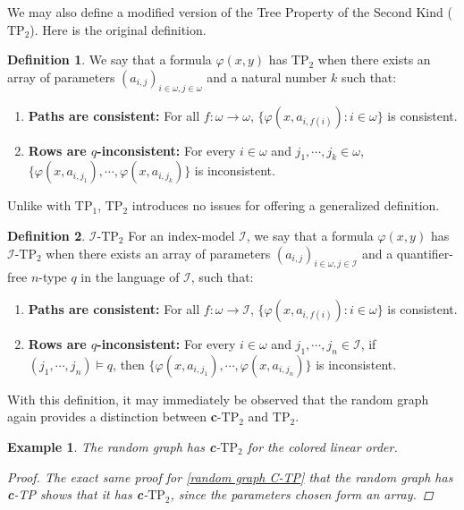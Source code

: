 \documentclass{article}
\newcommand{\calI}{\mathcal{I}}
\newcommand{\TPi}{\text{TP}_1}
\newcommand{\TPii}{\text{TP}_2}
\newcommand{\vphi}{\varphi}
\newtheorem{example}{Example}
\theoremstyle{definition}
\newtheorem{definition}{Definition}
\theoremstyle{definition}
\theoremstyle{definition}
\theoremstyle{definition}
\begin{document}
We may also define a modified version of the Tree Property of the Second Kind ($\TPii$). Here is the original definition.

\begin{definition}{}\label{TP2 definition}
        We say that a formula $\vphi(x,y)$ has $\text{TP}_2$ when there exists an array of parameters $(a_{i,j})_{i\in \omega, j\in \omega}$ and a natural number $k$ such that:

        \begin{enumerate}
    \item \textbf{Paths are consistent:} For all $f\colon \omega\to\omega$, $\{\vphi(x, a_{i,f(i)})\colon i\in\omega\}$ is consistent.

   \item \textbf{Rows are $q$-inconsistent:} For every $i\in\omega$ and $j_1,\dotsm, j_k\in \omega$,  $\{\vphi(x,a_{i,j_1}),\dotsm, \vphi(x,a_{i,j_k})\}$ is inconsistent.

\end{enumerate}
\end{definition}

Unlike with $\TPi$, $\TPii$ introduces no issues for offering a generalized definition. 
\begin{definition}{$\calI$-$\text{TP}_2$}
        For an index-model $\calI$, we say that a formula $\vphi(x,y)$ has $\calI$-$\text{TP}_2$ when there exists an array of parameters $(a_{i,j})_{i\in \omega, j\in \calI}$ and a quantifier-free $n$-type $q$ in the language of $\calI$, such that:

        \begin{enumerate}
    \item \textbf{Paths are consistent:} For all $f\colon \omega\to\calI$, $\{\vphi(x, a_{i,f(i)})\colon i\in\omega\}$ is consistent.

   \item \textbf{Rows are $q$-inconsistent:} For every $i\in\omega$ and $j_1,\dotsm, j_n\in \calI$, if $(j_1,\dotsm,j_n)\models q$, then $\{\vphi(x,a_{i,j_1}),\dotsm, \vphi(x,a_{i,j_n})\}$ is inconsistent.

\end{enumerate}
\end{definition}

With this definition, it may immediately be observed that the random graph again provides a distinction between \textbf{c}-$\TPii$ and $\TPii$.

\begin{example}
    The random graph has \textbf{c}-$\TPii$ for the colored linear order.
    \begin{proof}
        The exact same proof for \ref{random graph C-TP} that the random graph has \textbf{c}-TP shows that it has \textbf{c}-$\TPii$, since the parameters chosen form an array.
    \end{proof}
\end{example}
\end{document}
